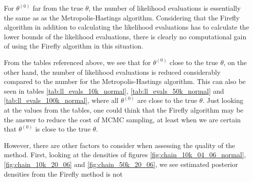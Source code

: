  
For $\theta^{\left(0\right)}$ far from the true $\theta$, the number of likelihood evaluations is essentially the same as as the Metropolis-Hastings algorithm.
Considering that the Firefly algorithm in addition to calculating the likelihood evaluations has to calculate the lower bounds of the likelihood evaluations, there is clearly no computational gain of using the Firefly algorithm in this situation.

From the tables referenced above, we see that for $\theta^{\left(0\right)}$ close to the true $\theta$, on the other hand,  the number of likelihood evaluations is reduced considerably compared to the number for the Metropolis-Hastings algorithm. 
This can also be seen in tables \ref{tab:ll_evals_10k_normal}, \ref{tab:ll_evals_50k_normal} and \ref{tab:ll_evals_100k_normal}, where all $\theta^{\left(0\right)}$ are close to the true $\theta$. Just looking at the values from the tables, one could think that the Firefly algorithm may be the answer to reduce the cost of MCMC sampling, at least when we are certain that $\theta^{\left(0\right)}$ is close to the true $\theta$. 

However, there are other factors to consider when assessing the quality of the method. First, looking at the densities of figures \ref{fig:chain_10k_04_06_normal}, \ref{fig:chain_10k_20_06} and  \ref{fig:chain_50k_20_06}, we see estimated posterior densities from the Firefly method is not 



